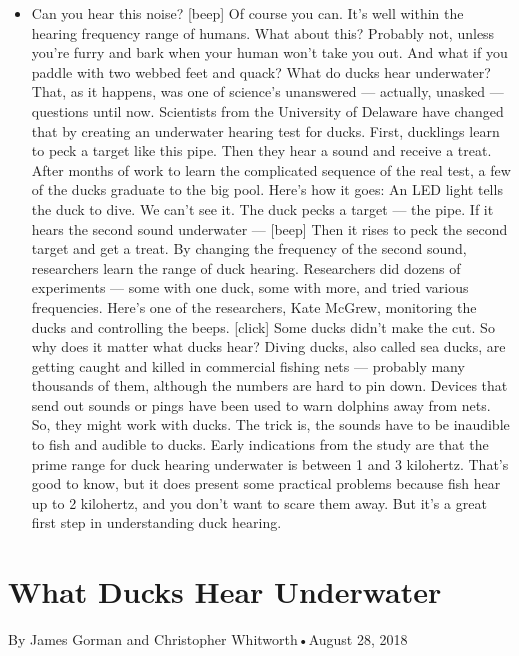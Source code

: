 \begin{itemize}
\tightlist
\item
  Can you hear this noise? {[}beep{]} Of course you can. It's well
  within the hearing frequency range of humans. What about this?
  Probably not, unless you're furry and bark when your human won't take
  you out. And what if you paddle with two webbed feet and quack? What
  do ducks hear underwater? That, as it happens, was one of science's
  unanswered --- actually, unasked --- questions until now. Scientists
  from the University of Delaware have changed that by creating an
  underwater hearing test for ducks. First, ducklings learn to peck a
  target like this pipe. Then they hear a sound and receive a treat.
  After months of work to learn the complicated sequence of the real
  test, a few of the ducks graduate to the big pool. Here's how it goes:
  An LED light tells the duck to dive. We can't see it. The duck pecks a
  target --- the pipe. If it hears the second sound underwater ---
  {[}beep{]} Then it rises to peck the second target and get a treat. By
  changing the frequency of the second sound, researchers learn the
  range of duck hearing. Researchers did dozens of experiments --- some
  with one duck, some with more, and tried various frequencies. Here's
  one of the researchers, Kate McGrew, monitoring the ducks and
  controlling the beeps. {[}click{]} Some ducks didn't make the cut. So
  why does it matter what ducks hear? Diving ducks, also called sea
  ducks, are getting caught and killed in commercial fishing nets ---
  probably many thousands of them, although the numbers are hard to pin
  down. Devices that send out sounds or pings have been used to warn
  dolphins away from nets. So, they might work with ducks. The trick is,
  the sounds have to be inaudible to fish and audible to ducks. Early
  indications from the study are that the prime range for duck hearing
  underwater is between 1 and 3 kilohertz. That's good to know, but it
  does present some practical problems because fish hear up to 2
  kilohertz, and you don't want to scare them away. But it's a great
  first step in understanding duck hearing.
\end{itemize}

\hypertarget{what-ducks-hear-underwater-1}{%
\section{What Ducks Hear
Underwater}\label{what-ducks-hear-underwater-1}}

By James Gorman and Christopher Whitworth•August 28, 2018

